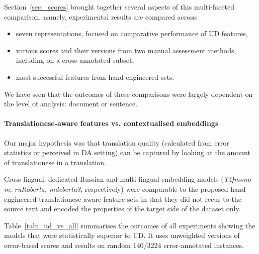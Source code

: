 Section~\ref{sec:_scores} brought together several aspects of this multi-faceted comparison, namely, experimental results are compared across:

\begin{itemize}\compresslist{}
	\item seven representations, focused on comparative performance of UD features,
	\item various scores and their versions from two manual assessment methods, including on a cross-annotated subset,
	\item most successful features from hand-engineered sets.
\end{itemize}

We have seen that the outcomes of these comparisons were largely dependent on the level of analysis: document or sentence.

\paragraph{Translationese-aware features vs. contextualised embeddings}
Our major hypothesis was that translation quality (calculated from error statistics or perceived in DA setting) can be captured by looking at the amount of translationese in a translation. 

Cross-lingual, dedicated Russian and multi-lingual embedding models (\textit{TQmono-m, ruRoberta, mdeberta3}, respectively) were comparable to the proposed hand-engineered translationese-aware feature sets in that they did not recur to the source text and encoded the properties of the target side of the dataset only.

Table~\ref{tab:_ud_vs_all} summarises the outcomes of all experiments showing the models that were statistically superior to UD. It uses unweighted versions of error-based scores and results on random 140/3224 error-annotated instances.

